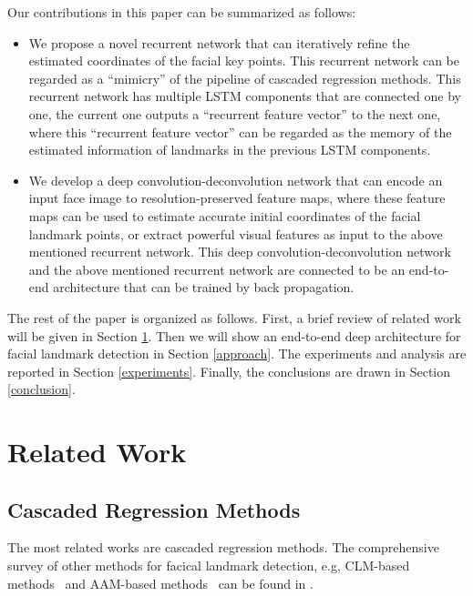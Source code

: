 \documentclass[journal]{IEEEtran}
\begin{document}
Our contributions in this paper can be summarized as follows:
\begin{itemize}
\item We propose a novel recurrent network that can iteratively refine the estimated coordinates of the facial key points. This recurrent network can be regarded as a ``mimicry'' of the pipeline of cascaded regression methods. This recurrent network has multiple LSTM components that are connected one by one, the current one outputs a ``recurrent feature vector'' to the next one, where this ``recurrent feature vector'' can be regarded as the memory of the estimated information of landmarks in the previous LSTM components.

\item We develop a deep convolution-deconvolution network that can encode an input face image to resolution-preserved feature maps, where these feature maps can be used to estimate accurate initial coordinates of the facial landmark points, or extract powerful visual features as input to the above mentioned recurrent network. This deep convolution-deconvolution network and the above mentioned recurrent network are connected to be an end-to-end architecture that can be trained by back propagation.

\end{itemize}


The rest of the paper is organized as follows. First, a brief review of related work will be given in Section \ref{related_work}. Then we will show an end-to-end deep architecture for facial landmark detection in Section \ref{approach}. The experiments and analysis are reported in Section \ref{experiments}. Finally, the conclusions are drawn in Section \ref{conclusion}.

\section{Related Work}
\label{related_work}
%

\subsection{Cascaded Regression Methods}
The most related works are cascaded regression methods. The comprehensive survey of other methods for facical landmark detection, e.g, CLM-based methods~\cite{martinez2013local} and AAM-based methods~\cite{gao2010review} can be found in \cite{wangsurvey}. 
\end{document}
